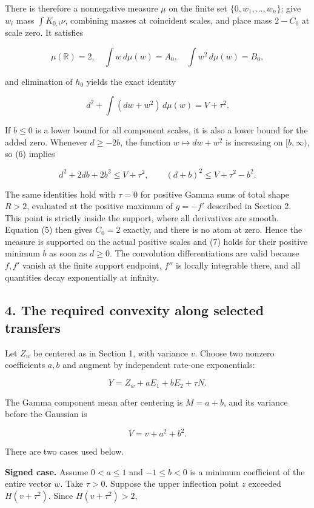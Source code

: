 \documentclass[10pt,a4paper]{article}
\begin{document}
There is therefore a nonnegative measure \(\mu\) on the finite set
\(\{0,w_1,\ldots,w_n\}\): give \(w_i\) mass \(\int K_{0,i}\nu\),
combining masses at coincident scales, and place mass \(2-C_0\) at scale
zero. It satisfies

\[
\mu(\mathbb R)=2,
\quad\int w\,d\mu(w)=A_0,
\quad\int w^2\,d\mu(w)=B_0,
\]

and elimination of \(h_0\) yields the exact identity

\[
d^2+\int (dw+w^2)\,d\mu(w)=V+\tau^2.             \tag{6}
\]

If \(b\le0\) is a lower bound for all component scales, it is also a
lower bound for the added zero. Whenever \(d\ge-2b\), the function
\(w\mapsto dw+w^2\) is increasing on \([b,\infty)\), so (6) implies

\[
d^2+2db+2b^2\le V+\tau^2,
\qquad (d+b)^2\le V+\tau^2-b^2.                   \tag{7}
\]

The same identities hold with \(\tau=0\) for positive Gamma sums of
total shape \(R>2\), evaluated at the positive maximum of \(g=-f'\)
described in Section 2. This point is strictly inside the support, where
all derivatives are smooth. Equation (5) then gives \(C_0=2\) exactly,
and there is no atom at zero. Hence the measure is supported on the
actual positive scales and (7) holds for their positive minimum \(b\) as
soon as \(d\ge0\). The convolution differentiations are valid because
\(f,f'\) vanish at the finite support endpoint, \(f''\) is locally
integrable there, and all quantities decay exponentially at infinity.

\subsection{4. The required convexity along selected
transfers}\label{the-required-convexity-along-selected-transfers}

Let \(Z_w\) be centered as in Section 1, with variance \(v\). Choose two
nonzero coefficients \(a,b\) and augment by independent rate-one
exponentials:

\[
Y=Z_w+aE_1+bE_2+\tau N.
\]

The Gamma component mean after centering is \(M=a+b\), and its variance
before the Gaussian is

\[
V=v+a^2+b^2.
\]

There are two cases used below.

\textbf{Signed case.} Assume \(0<a\le1\) and \(-1\le b<0\) is a minimum
coefficient of the entire vector \(w\). Take \(\tau>0\). Suppose the
upper inflection point \(z\) exceeded \(H(v+\tau^2)\). Since
\(H(v+\tau^2)>2\),
\end{document}
